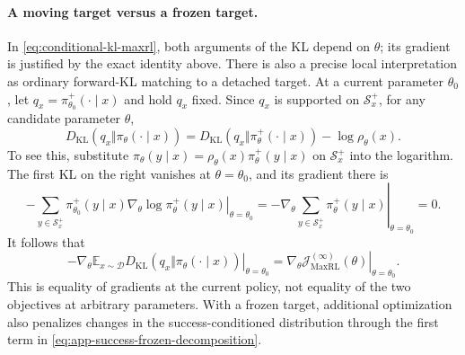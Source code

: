 \paragraph{A moving target versus a frozen target.}
In \eqref{eq:conditional-kl-maxrl}, both arguments of the KL depend on
$\theta$; its gradient is justified by the exact identity above.
There is also a precise local interpretation as ordinary forward-KL
matching to a detached target. At a current parameter $\theta_0$, let
$q_x=\pi_{\theta_0}^+(\cdot\mid x)$ and hold $q_x$ fixed. Since $q_x$
is supported on $\mathcal S_x^+$, for any candidate parameter $\theta$,
\begin{equation}
 D_{\mathrm{KL}}(q_x\Vert\pi_\theta(\cdot\mid x))
 =D_{\mathrm{KL}}(q_x\Vert\pi_\theta^+(\cdot\mid x))
       -\log\rho_\theta(x).
 \label{eq:app-success-frozen-decomposition}
\end{equation}
To see this, substitute
$\pi_\theta(y\mid x)=\rho_\theta(x)\pi_\theta^+(y\mid x)$
on $\mathcal S_x^+$ into the logarithm. The first KL on the right
vanishes at $\theta=\theta_0$, and its gradient there is
\[
 -\sum_{y\in\mathcal S_x^+}\pi_{\theta_0}^+(y\mid x)
       \left.\nabla_\theta\log\pi_\theta^+(y\mid x)
       \right|_{\theta=\theta_0}
 =-\left.\nabla_\theta\sum_{y\in\mathcal S_x^+}
       \pi_\theta^+(y\mid x)\right|_{\theta=\theta_0}=0.
\]
It follows that
\begin{equation}
 \left.-\nabla_\theta\mathbb E_{x\sim\mathcal D}
       D_{\mathrm{KL}}(q_x\Vert\pi_\theta(\cdot\mid x))
       \right|_{\theta=\theta_0}
 =\left.\nabla_\theta\mathcal J_{\mathrm{MaxRL}}^{(\infty)}(\theta)
       \right|_{\theta=\theta_0}.
 \label{eq:app-success-frozen-gradient}
\end{equation}
This is equality of gradients at the current policy, not equality of
the two objectives at arbitrary parameters. With a frozen target,
additional optimization also penalizes changes in the success-conditioned
distribution through the first term in
\eqref{eq:app-success-frozen-decomposition}.

